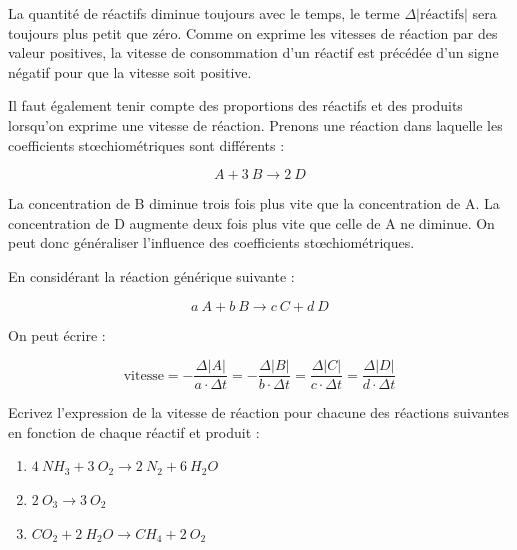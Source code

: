 \documentclass[
  11pt,
  a4paper,
  openany]{book}
\providecommand{\tightlist}{%
  \setlength{\itemsep}{0pt}\setlength{\parskip}{0pt}}
\begin{document}
La quantité de réactifs diminue toujours avec le temps, le terme \(\Delta |\text{réactifs}|\) sera toujours plus petit que zéro. Comme on exprime les vitesses de réaction par des valeur positives, la vitesse de consommation d'un réactif est précédée d'un signe négatif pour que la vitesse soit positive.

Il faut également tenir compte des proportions des réactifs et des produits lorsqu'on exprime une vitesse de réaction. Prenons une réaction dans laquelle les coefficients stœchiométriques sont différents :

\[
A + 3\ B \rightarrow 2\ D
\]

La concentration de B diminue trois fois plus vite que la concentration de A. La concentration de D augmente deux fois plus vite que celle de A ne diminue. On peut donc généraliser l'influence des coefficients stœchiométriques.

\newpage

En considérant la réaction générique suivante :

\[
a\ A + b\ B \rightarrow c\ C + d\ D
\]

On peut écrire :

\[
\text{vitesse} = - \frac{\Delta |A|}{a \cdot \Delta t} = - \frac{\Delta |B|}{b \cdot \Delta t} = \frac{\Delta |C|}{c \cdot \Delta t} = \frac{\Delta |D|}{d \cdot \Delta t}
\]

\begin{Exercise}

Ecrivez l'expression de la vitesse de réaction pour chacune des réactions suivantes en fonction de chaque réactif et produit :

\begin{enumerate}
\def\labelenumi{\arabic{enumi}.}
\tightlist
\item
  \(4\ NH_3 + 3\ O_2 \rightarrow 2\ N_2 + 6\ H_2O\)
\item
  \(2\ O_3 \rightarrow 3\ O_2\)
\item
  \(CO_2 + 2\ H_2O \rightarrow CH_4 + 2\ O_2\)
\end{enumerate}

\end{Exercise}
\end{document}
